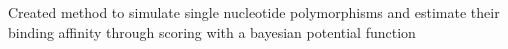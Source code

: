 \documentclass[letterpaper]{deedy-resume} %
\begin{document}
\begin{minipage}[t]{0.66\textwidth}
\begin{tightitemize}
\item Created method to simulate single nucleotide polymorphisms and estimate their binding affinity through scoring with a bayesian potential function
\end{tightitemize}














\end{minipage}
\end{document}
